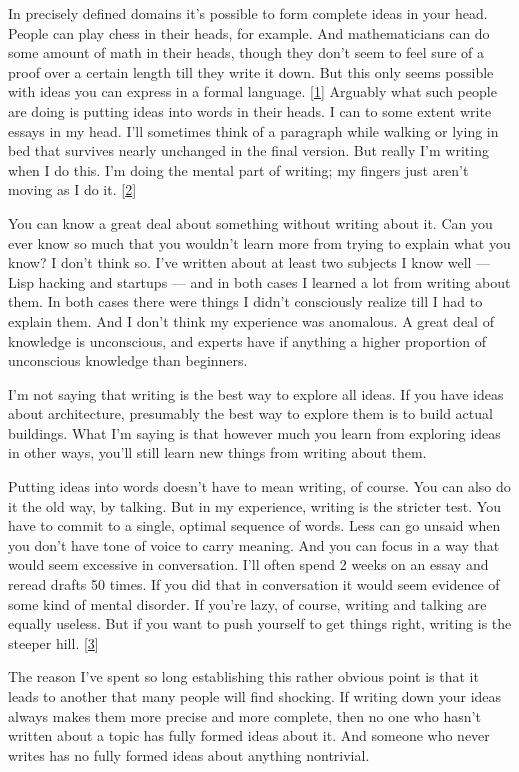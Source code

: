 In precisely defined domains it's possible to form complete ideas in
your head. People can play chess in their heads, for example. And
mathematicians can do some amount of math in their heads, though they
don't seem to feel sure of a proof over a certain length till they write
it down. But this only seems possible with ideas you can express in a
formal language. {[}\hyperref[f1n]{1}{]} Arguably what such people are
doing is putting ideas into words in their heads. I can to some extent
write essays in my head. I'll sometimes think of a paragraph while
walking or lying in bed that survives nearly unchanged in the final
version. But really I'm writing when I do this. I'm doing the mental
part of writing; my fingers just aren't moving as I do it.
{[}\hyperref[f2n]{2}{]}

You can know a great deal about something without writing about it. Can
you ever know so much that you wouldn't learn more from trying to
explain what you know? I don't think so. I've written about at least two
subjects I know well --- Lisp hacking and startups --- and in both cases
I learned a lot from writing about them. In both cases there were things
I didn't consciously realize till I had to explain them. And I don't
think my experience was anomalous. A great deal of knowledge is
unconscious, and experts have if anything a higher proportion of
unconscious knowledge than beginners.

I'm not saying that writing is the best way to explore all ideas. If you
have ideas about architecture, presumably the best way to explore them
is to build actual buildings. What I'm saying is that however much you
learn from exploring ideas in other ways, you'll still learn new things
from writing about them.

Putting ideas into words doesn't have to mean writing, of course. You
can also do it the old way, by talking. But in my experience, writing is
the stricter test. You have to commit to a single, optimal sequence of
words. Less can go unsaid when you don't have tone of voice to carry
meaning. And you can focus in a way that would seem excessive in
conversation. I'll often spend 2 weeks on an essay and reread drafts 50
times. If you did that in conversation it would seem evidence of some
kind of mental disorder. If you're lazy, of course, writing and talking
are equally useless. But if you want to push yourself to get things
right, writing is the steeper hill. {[}\hyperref[f3n]{3}{]}

The reason I've spent so long establishing this rather obvious point is
that it leads to another that many people will find shocking. If writing
down your ideas always makes them more precise and more complete, then
no one who hasn't written about a topic has fully formed ideas about it.
And someone who never writes has no fully formed ideas about anything
nontrivial.

